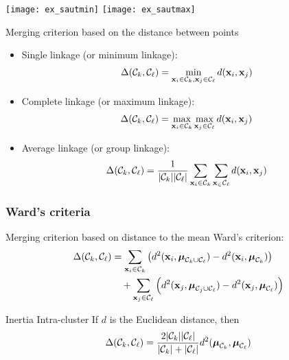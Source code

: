 \documentclass{beamer}\usepackage[]{graphicx}\usepackage[]{color}
\begin{document}
\begin{frame}

  \begin{center}
    \texttt{[image: ex\_sautmin]}
    \hspace*{.1\textwidth}
    \texttt{[image: ex\_sautmax]}
  \end{center}

  \begin{block}{Merging criterion based on the distance between points}
    \begin{itemize}
      \item Single linkage (or minimum linkage):
      \begin{align*}
        \Delta(\mathcal{C}_k, \mathcal{C}_\ell) = \min_{\mathbf{x}_i \in \mathcal{C}_k, \mathbf{x}_j \in \mathcal{C}_\ell} d(\mathbf{x}_i, \mathbf{x}_j)
      \end{align*}
      \item Complete linkage (or maximum linkage):
      \begin{align*}
        \Delta(\mathcal{C}_k, \mathcal{C}_\ell) = \max_{\mathbf{x}_i \in \mathcal{C}_k} \max_{\mathbf{x}_j \in \mathcal{C}_\ell}d(\mathbf{x}_i, \mathbf{x}_j)
    \end{align*}
    \item Average linkage (or group linkage):
      \begin{align*}
        \Delta(\mathcal{C}_k, \mathcal{C}_\ell) = \frac{1}{|\mathcal{C}_k||\mathcal{C}_\ell|} \sum_{\mathbf{x}_i \in \mathcal{C}_k}\sum_{\mathbf{x}_ \in\mathcal{C}_\ell} d(\mathbf{x}_i, \mathbf{x}_j)
      \end{align*}
    \end{itemize}
  \end{block}

\end{frame}

\begin{frame}
  \frametitle{Ward's criteria}
  
  \begin{block}{Merging criterion based on distance to the mean}
    Ward's criterion:
    \begin{align*}
      \Delta(\mathcal{C}_k, \mathcal{C}_\ell) 
        & = \sum_{\mathbf{x}_i \in \mathcal{C}_k} \left( d^2(\mathbf{x}_i, \boldsymbol{\mu}_{\mathcal{C}_k \cup \mathcal{C}_\ell} ) - d^2(\mathbf{x}_i, \boldsymbol{\mu}_{\mathcal{C}_k}) \right) \\
        & \quad + \sum_{\mathbf{x}_j \in \mathcal{C}_\ell} \left( d^2(\mathbf{x}_j, \boldsymbol{\mu}_{\mathcal{C}_j \cup \mathcal{C}_\ell} ) - d^2(\mathbf{x}_j, \boldsymbol{\mu}_{\mathcal{C}_\ell}) \right)
      \end{align*}
    \end{block}

    \begin{block}{Inertia Intra-cluster}
       If $d$ is the Euclidean distance, then
      \begin{align*}
        \Delta(\mathcal{C}_k, \mathcal{C}_\ell) = \frac{2|\mathcal{C}_k||\mathcal{C}_\ell|}{|\mathcal{C}_k|+|\mathcal{C}_\ell|}d^2(\boldsymbol{\mu}_{\mathcal{C}_k}, \boldsymbol{\mu}_{\mathcal{C}_\ell})
      \end{align*}
    \end{block}

\end{frame}
\end{document}
